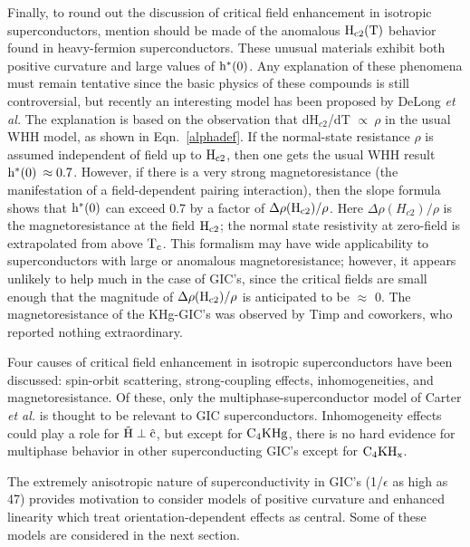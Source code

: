         Finally, to round out the discussion  of critical field enhancement
in isotropic superconductors, mention should be made  of the anomalous $\rm
H_{c2}(T)$ behavior found in heavy-fermion  superconductors.\cite{delong87}
These  unusual materials  exhibit both   positive curvature and  large
values of $\rm  h^*(0)$.  Any explanation  of  these phenomena must  remain
tentative  since   the  basic   physics    of these compounds   is    still
controversial,\cite{lee86}  but  recently  an  interesting   model has been
proposed by  DeLong {\em et al.\/}\cite{delong87} The  explanation is based
on the observation  that dH$_{c2}$/dT $\propto  \: \rho$  in the  usual WHH
model, as shown in Eqn.~\ref{alphadef}. If  the normal-state resistance  $\rho$  is  assumed
independent of field up to $\rm H_{c2}$, then one gets the usual WHH result
$\rm h^*(0)   \:  \approx  0.7$.  However,   if  there   is a  very  strong
magnetoresistance    (the   manifestation   of  a  field-dependent  pairing
interaction), then the slope formula shows that $\rm h^*(0)$ can exceed 0.7
by a factor of $\rm \Delta
\rho(H_{c2}) / \rho$.\cite{delong87} Here $\Delta \rho(H_{c2}) / \rho$ is
the magnetoresistance  at  the   field $\rm  H_{c2}$;  the    normal  state
resistivity at  zero-field  is   extrapolated from above  $\rm T_c$.   This
formalism  may have wide applicability   to superconductors with  large  or
anomalous magnetoresistance; however, it appears  unlikely to help  much in
the case  of GIC's, since the critical  fields  are  small  enough that the
magnitude of $\rm \Delta
\rho(H_{c2})/\rho$ is anticipated to be $\approx$ 0.  The magnetoresistance
of the KHg-GIC's was  observed by Timp  and coworkers, who reported nothing
extraordinary.\cite{W179}

        Four    causes  of    critical  field   enhancement    in isotropic
superconductors have been discussed: spin-orbit scattering, strong-coupling
effects, inhomogeneities,  and magnetoresistance.    Of  these, only  the
multiphase-superconductor model of  Carter {\em et al.\/}  is thought to be
relevant to  GIC superconductors.  Inhomogeneity  effects could play a role
for $\rm \vec{H} \perp \hat{c}$,  but except for $\rm C_4KHg$,  there is no
hard evidence for multiphase behavior in other superconducting GIC's except
for $\rm C_4KH_x$.\cite{Z260,suzuki85c}  

        The extremely anisotropic  nature  of superconductivity  in   GIC's
(1/$\epsilon$  as  high as 47\cite{iye83})  provides motivation to consider
models   of   positive  curvature  and    enhanced  linearity which   treat
orientation-dependent effects as central.  Some of these models are
considered in the next section.

